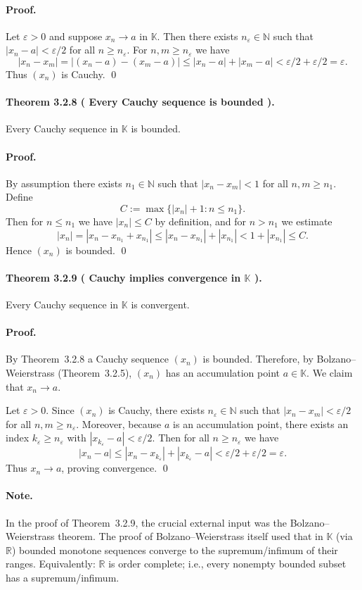 \documentclass[12pt]{article}
\newcommand{\N}{\mathbb{N}}
\newcommand{\R}{\mathbb{R}}
\newcommand{\K}{\mathbb{K}} %
\newcommand{\eps}{\varepsilon}
\newcommand{\NumberedTheorem}[3]{%
\paragraph*{Theorem #1 ( #2 ).} #3\par}
\begin{document}
\paragraph{Proof.} Let $\eps>0$ and suppose $x_n\to a$ in $\K$. Then there exists $n_\eps\in\N$ such that $|x_n-a|<\eps/2$ for all $n\ge n_\eps$. For $n,m\ge n_\eps$ we have
\[
	|x_n-x_m| = |(x_n-a)-(x_m-a)| \le |x_n-a| + |x_m-a| < \eps/2+\eps/2 = \eps.
\]
Thus $(x_n)$ is Cauchy. \qed

\NumberedTheorem{3.2.8}{Every Cauchy sequence is bounded}{Every Cauchy sequence in $\K$ is bounded.}

\paragraph{Proof.} By assumption there exists $n_1\in\N$ such that $|x_n-x_m|<1$ for all $n,m\ge n_1$. Define
\[
	C := \max\{ |x_n|+1 : n\le n_1\}.
\]
Then for $n\le n_1$ we have $|x_n|\le C$ by definition, and for $n>n_1$ we estimate
\[
	|x_n| = |x_n-x_{n_1}+x_{n_1}| \le |x_n-x_{n_1}| + |x_{n_1}| < 1 + |x_{n_1}| \le C.
\]
Hence $(x_n)$ is bounded. \qed

\NumberedTheorem{3.2.9}{Cauchy implies convergence in $\K$}{Every Cauchy sequence in $\K$ is convergent.}

\paragraph{Proof.} By Theorem~3.2.8 a Cauchy sequence $(x_n)$ is bounded. Therefore, by Bolzano--Weierstrass (Theorem~3.2.5), $(x_n)$ has an accumulation point $a\in\K$. We claim that $x_n\to a$.

Let $\eps>0$. Since $(x_n)$ is Cauchy, there exists $n_\eps\in\N$ such that $|x_n-x_m|<\eps/2$ for all $n,m\ge n_\eps$. Moreover, because $a$ is an accumulation point, there exists an index $k_\eps\ge n_\eps$ with $|x_{k_\eps}-a|<\eps/2$. Then for all $n\ge n_\eps$ we have
\[
	|x_n-a| \le |x_n-x_{k_\eps}| + |x_{k_\eps}-a| < \eps/2 + \eps/2 = \eps.
\]
Thus $x_n\to a$, proving convergence. \qed

\paragraph{Note.} In the proof of Theorem~3.2.9, the crucial external input was the Bolzano--Weierstrass theorem. The proof of Bolzano--Weierstrass itself used that in $\K$ (via $\R$) bounded monotone sequences converge to the supremum/infimum of their ranges. Equivalently: $\R$ is order complete; i.e., every nonempty bounded subset has a supremum/infimum.
\end{document}
